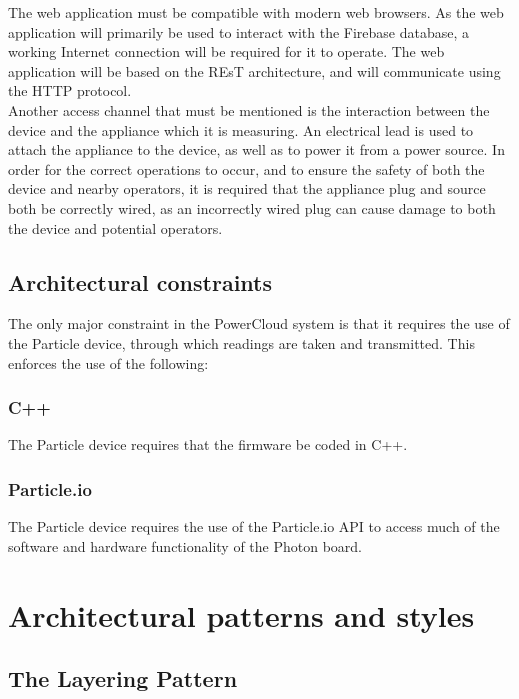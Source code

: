 \documentclass{article}
\begin{document}
	The web application must be compatible with modern web browsers. As 
	the web application will primarily be used to interact with the 
	Firebase database, a working Internet connection will be required for 
	it to operate. The web application will be based on the REsT 
	architecture, and will communicate using the HTTP protocol.\\
	
	Another access channel that must be mentioned is the interaction 
	between the device and the appliance which it is measuring. An 
	electrical lead is used to attach the appliance to the device, as 
	well as to power it from a power source. In order for the correct 
	operations to occur, and to ensure the safety of both the device and 
	nearby operators, it is required that the appliance plug and source 
	both be correctly wired, as an incorrectly wired plug can cause 
	damage to both the device and potential operators.
	
	\subsection{Architectural constraints}
	
	The only major constraint in the PowerCloud system is that it 
	requires the use of the Particle device, through which readings are 
	taken and transmitted. This enforces the use of the following:\\
	
	\subsubsection{C++}
	The Particle device requires that the firmware be coded in C++.\\
	
	\subsubsection{Particle.io}
	The Particle device requires the use of the Particle.io API to access 
	much of the software and hardware functionality of the Photon board.

\newpage

\section{Architectural patterns and styles}

	\subsection{The Layering Pattern}
	
\end{document}
